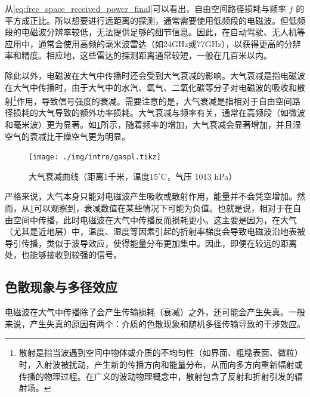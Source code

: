 从\cref{eq:free_space_received_power_final}可以看出，自由空间路径损耗与频率 $f$ 的平方成正比。所以想要进行远距离的探测，通常需要使用低频段的电磁波。但低频段的电磁波分辨率较低，无法提供足够的细节信息。因此，在自动驾驶、无人机等应用中，通常会使用高频的毫米波雷达（如24GHz或77GHz），以获得更高的分辨率和精度。相应地，这些雷达的探测距离通常较短，一般在几百米以内。

除此以外，电磁波在大气中传播时还会受到大气衰减的影响。大气衰减是指电磁波在大气中传播时，由于大气中的水汽、氧气、二氧化碳等分子对电磁波的吸收和散射\footnote{散射是指当波遇到空间中物体或介质的不均匀性（如界面、粗糙表面、微粒）时，入射波被扰动，产生新的传播方向和能量分布，从而向多方向重新辐射或传播的物理过程。在广义的波动物理概念中，散射包含了反射和折射引发的辐射场。}作用，导致信号强度的衰减。需要注意的是，大气衰减是指相对于自由空间路径损耗的大气导致的额外功率损耗。大气衰减与频率有关，通常在高频段（如微波和毫米波）更为显著。如\cref{fig_chp1_gaspl}所示，随着频率的增加，大气衰减会显著增加，并且湿空气的衰减比干燥空气更为明显。

\begin{figure}[htb!]
    \centering
    \texttt{[image: ./img/intro/gaspl.tikz]}
    \caption{大气衰减曲线\supercite{itu_r_p676_11}（距离1千米，温度$15^\circ$C，气压 $1013$ hPa）}
    \label{fig_chp1_gaspl}
\end{figure}

严格来说，大气本身只能对电磁波产生吸收或散射作用，能量并不会凭空增加。然而，从\cref{fig_chp1_gaspl}可以观察到，衰减数值在某些情况下可能为负值。也就是说，相对于在自由空间中传播，此时电磁波在大气中传播反而损耗更小。这主要是因为，在大气（尤其是近地层）中，温度、湿度等因素引起的折射率梯度会导致电磁波沿地表被导引传播，类似于波导效应，使得能量分布更加集中。因此，即便在较远的距离处，也能够接收到较强的信号。



\subsection{色散现象与多径效应}
电磁波在大气中传播除了会产生传输损耗（衰减）之外，还可能会产生失真。一般来说，产生失真的原因有两个：介质的色散现象和随机多径传输导致的干涉效应。


